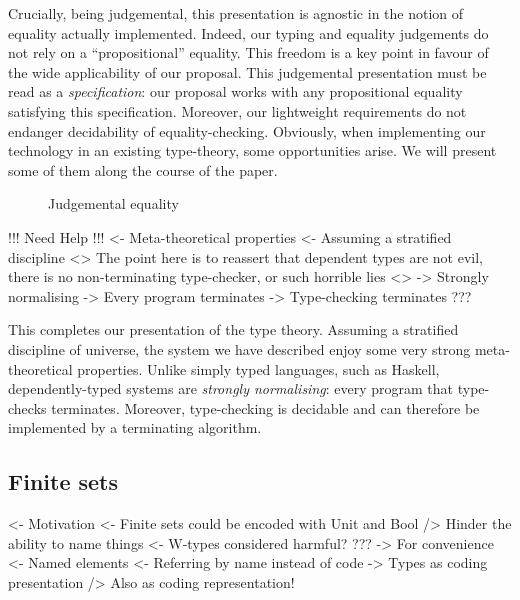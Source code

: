 Crucially, being judgemental, this presentation is agnostic in the
notion of equality actually implemented. Indeed, our typing and
equality judgements do not rely on a ``propositional'' equality. This
freedom is a key point in favour of the wide applicability of our
proposal. This judgemental presentation must be read as a
\emph{specification}: our proposal works with any propositional
equality satisfying this specification. Moreover, our lightweight
requirements do not endanger decidability of equality-checking.
Obviously, when implementing our technology in an existing
type-theory, some opportunities arise. We will present some of them
along the course of the paper.


\begin{figure}



\caption{Judgemental equality}
\label{fig:judgemental-equality}

\end{figure}



\begin{wstructure}
!!! Need Help !!!
<- Meta-theoretical properties
    <- Assuming a stratified discipline
    <> The point here is to reassert that dependent types are not evil, 
       there is no non-terminating type-checker, or such horrible lies <>
    -> Strongly normalising
        -> Every program terminates
    -> Type-checking terminates
    ???
\end{wstructure}

This completes our presentation of the type theory. Assuming a
stratified discipline of universe, the system we have described enjoy
some very strong meta-theoretical properties. Unlike simply typed
languages, such as Haskell, dependently-typed systems are
\emph{strongly normalising}: every program that type-checks
terminates. Moreover, type-checking is decidable and can therefore be
implemented by a terminating algorithm.


\subsection{Finite sets}
\label{sec:finite-sets}

\begin{wstructure}
<- Motivation
    <- Finite sets could be encoded with Unit and Bool
        /> Hinder the ability to name things
    <- W-types considered harmful?
        ???
    -> For convenience
        <- Named elements
        <- Referring by name instead of code
        -> Types as coding presentation
            /> Also as coding representation!
\end{wstructure}


